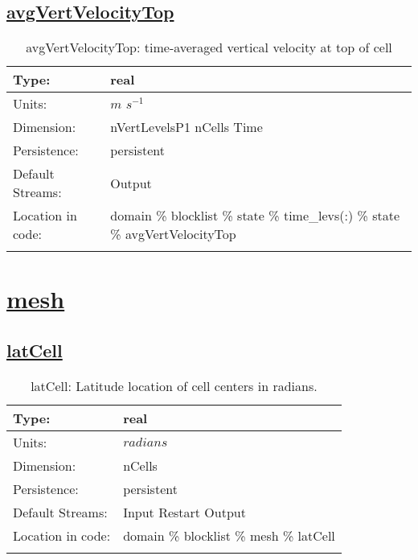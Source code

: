 \subsection[avgVertVelocityTop]{\hyperref[sec:var_tab_state]{avgVertVelocityTop}}
\label{subsec:var_sec_state_avgVertVelocityTop}
\begin{center}
\begin{longtable}{| p{2.0in} | p{4.0in} |}
        \hline 
        Type: & real \\
        \hline 
        Units: & $m$ $s^{-1}$ \\
        \hline 
        Dimension: & nVertLevelsP1 nCells Time \\
        \hline 
        Persistence: & persistent \\
        \hline 
		 Default Streams: & Output  \\
        \hline 
		 Location in code: & domain \% blocklist \% state \% time\_levs(:) \% state \% avgVertVelocityTop \\
		 \hline 
    \caption{avgVertVelocityTop: time-averaged vertical velocity at top of cell}
\end{longtable}
\end{center}
\section[mesh]{\hyperref[sec:var_tab_mesh]{mesh}}
\label{sec:var_sec_mesh}
\subsection[latCell]{\hyperref[sec:var_tab_mesh]{latCell}}
\label{subsec:var_sec_mesh_latCell}
\begin{center}
\begin{longtable}{| p{2.0in} | p{4.0in} |}
        \hline 
        Type: & real \\
        \hline 
        Units: & $radians$ \\
        \hline 
        Dimension: & nCells \\
        \hline 
        Persistence: & persistent \\
        \hline 
		 Default Streams: & Input Restart Output  \\
        \hline 
		 Location in code: & domain \% blocklist \% mesh \% latCell \\
		 \hline 
    \caption{latCell: Latitude location of cell centers in radians.}
\end{longtable}
\end{center}
